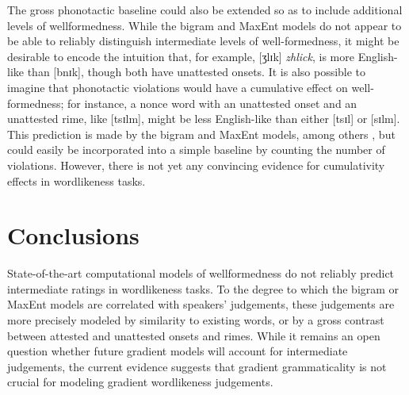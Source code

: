 The gross phonotactic baseline could also be extended so as to include additional levels of wellformedness. While the bigram and MaxEnt models do not appear to be able to reliably distinguish intermediate levels of well-formedness, it might be desirable to encode the intuition that, for example, [ʒlɪk] \emph{zhlick}, is more English-like than [bnɪk], though both have unattested onsets. It is also possible to imagine that phonotactic violations would have a cumulative effect on well-formedness; for instance, a nonce word with an unattested onset and an unattested rime, like [tsɪlm], might be less English-like than either [tsɪl] or [sɪlm]. This prediction is made by the bigram and MaxEnt models, among others \citep[e.g.,][]{Albright2008,Anttila1997}, but could easily be incorporated into a simple baseline by counting the number of violations. However, there is not yet any convincing evidence for cumulativity effects in wordlikeness tasks.

\section{Conclusions}

State-of-the-art computational models of wellformedness do not reliably predict intermediate ratings in wordlikeness tasks. To the degree to which the bigram or MaxEnt models are correlated with speakers' judgements, these judgements are more precisely modeled by similarity to existing words, or by a gross contrast between attested and unattested onsets and rimes. 
While it remains an open question whether future gradient models will account for intermediate judgements, the current evidence suggests that gradient grammaticality is not crucial for modeling gradient wordlikeness judgements.

